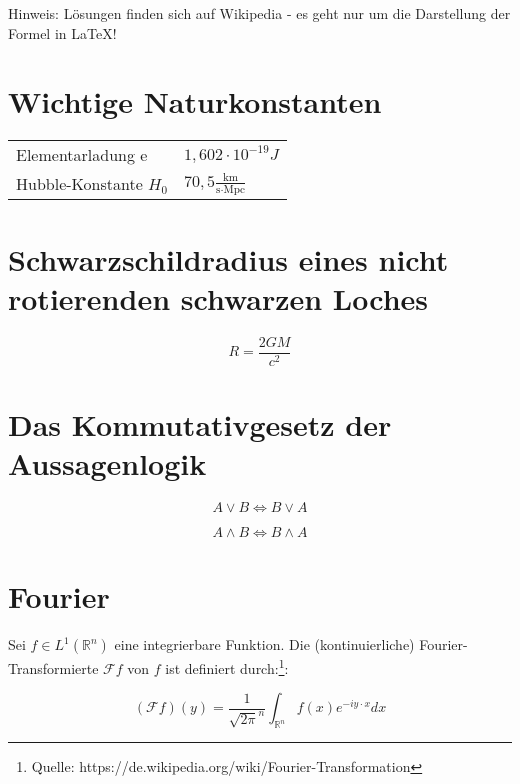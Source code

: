 \documentclass[a4paper,10pt]{article}
\begin{document}
Hinweis: Lösungen finden sich auf Wikipedia - es geht nur um die Darstellung der Formel in LaTeX!
\section{Wichtige Naturkonstanten}
\begin{center}
\begin{tabular}{ll}
Elementarladung e & $1,602 \cdot 10^{-19}J$  \\
Hubble-Konstante $H_0$  & $70,5\frac{\text{km}}{\text{s}\cdot \text{Mpc}}$ 
\end{tabular}
\end{center}

\section{Schwarzschildradius eines nicht rotierenden schwarzen Loches}
\begin{equation}
  R = \frac{2GM}{c^2}
\end{equation}

\section{Das Kommutativgesetz der Aussagenlogik}

\begin{equation*}
  A \vee B \iff B \vee A
\end{equation*}

\begin{equation*}
  A \land B \iff B \land A
\end{equation*}


\section{Fourier}
Sei $f\in L^{1}(\mathbb{R}^{n})$ eine integrierbare Funktion. Die (kontinuierliche) Fourier-Transformierte $\mathcal{F}f$ von $f$ ist definiert durch:\footnote{Quelle: https://de.wikipedia.org/wiki/Fourier-Transformation}:

\begin{equation}
  (\mathcal{F}f)(y) = \frac{1}{\sqrt{2\pi}^n} \int_{\mathbb{R}^n}f(x)e^{-iy\cdot x}dx
\end{equation}
\end{document}
